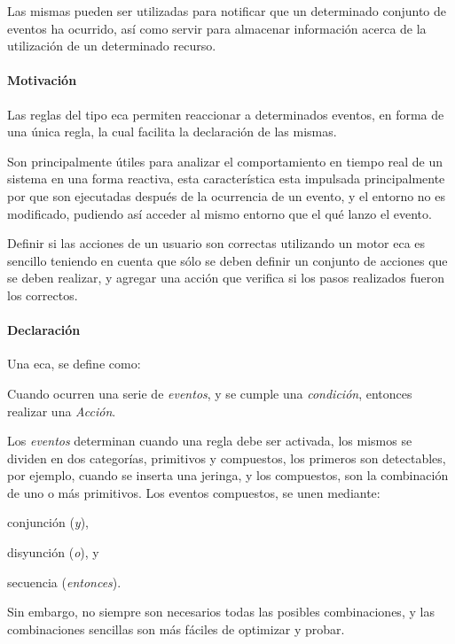 Las mismas pueden ser utilizadas para notificar que un determinado conjunto de
eventos ha ocurrido\cite{bailey2004event}, así como servir para almacenar
información acerca de la utilización de un determinado recurso.


\paragraph{Motivación}

Las reglas del tipo \gls{eca} permiten reaccionar a determinados eventos, en
forma de una única regla, la cual facilita la declaración de las
mismas\cite{bailey2004event}.

Son principalmente útiles para analizar el comportamiento en tiempo real de un
sistema en una forma
reactiva\cite{bailey2004event}\cite{de2001eca}\cite{bailey2002analysis}, esta
característica esta impulsada principalmente por que son ejecutadas después de
la ocurrencia de un evento, y el entorno no es modificado, pudiendo así acceder
al mismo entorno que el qué lanzo el evento.

Definir si las acciones de un usuario son correctas utilizando un motor
\gls{eca} es sencillo teniendo en cuenta que sólo se deben definir un
conjunto de acciones que se deben realizar, y agregar una acción que verifica si
los pasos realizados fueron los correctos.

\paragraph{Declaración}

Una \gls{eca}, se define como\cite{bailey2004event}\cite{behrends2006combining}:

\begin{displayquote}
	 Cuando ocurren una serie de \emph{eventos}, y se cumple una
	 \emph{condición}, entonces realizar una \emph{Acción}.
\end{displayquote}

Los \emph{eventos} determinan cuando una regla debe ser activada, los mismos se
dividen en dos categorías\cite{behrends2006combining}, primitivos y compuestos,
los primeros son detectables, por ejemplo, cuando se inserta una jeringa, y los
compuestos, son la combinación de uno o más
primitivos\cite{bailey2004event}\cite{behrends2006combining}. Los eventos
compuestos, se unen mediante:
\begin{enumerate*}[label=\itshape\alph*\upshape)]
\item conjunción (\emph{y}),
\item disyunción (\emph{o}), y
\item secuencia (\emph{entonces}).
\end{enumerate*}
Sin embargo, no siempre son necesarios todas las posibles combinaciones, y las
combinaciones sencillas son más fáciles de optimizar y
probar\cite{bailey2004event}.

